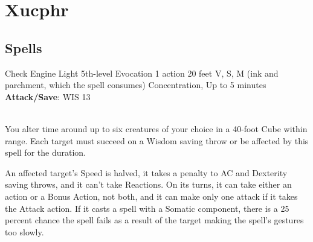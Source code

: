 \chapter*{Xucphr}

\section{Spells}

\DndSpellHeader%
  {Check Engine Light}
  {5th-level Evocation}
  {1 action}
  {20 feet}
  {V, S, M (ink and parchment, which the spell consumes)}
  {Concentration, Up to 5 minutes}
  {\textbf{Attack/Save}: WIS 13}\\\
  
  
	You alter time around up to six creatures of your choice in a 40-foot Cube within range. Each target must succeed on a Wisdom saving throw or be affected by this spell for the duration.
	
	An affected target’s Speed is halved, it takes a  penalty to AC and Dexterity saving throws, and it can’t take Reactions. On its turns, it can take either an action or a Bonus Action, not both, and it can make only one attack if it takes the Attack action. If it casts a spell with a Somatic component, there is a 25 percent chance the spell fails as a result of the target making the spell’s gestures too slowly.

